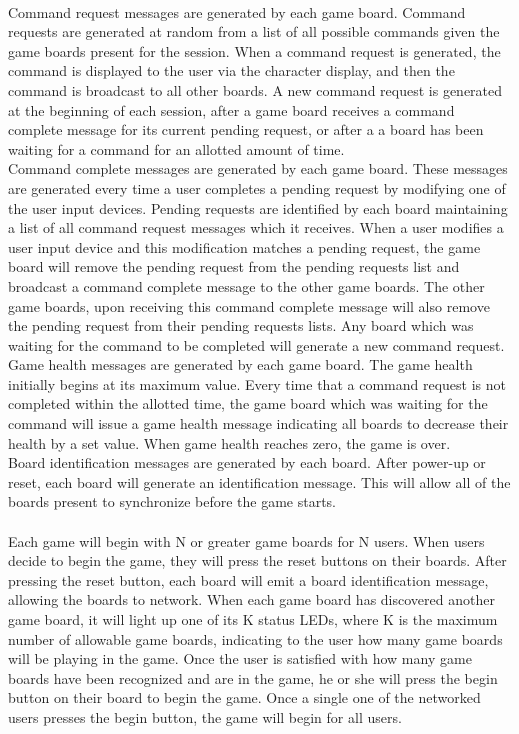 \documentclass[aps,letterpaper,10pt]{revtex4}
\begin{document}
\\

Command request messages are generated by each game board. Command requests are generated at random from a list of all possible commands given the game boards present for the session. When a command request is generated, the command is displayed to the user via the character display, and then the command is broadcast to all other boards. A new command request is generated at the beginning of each session, after a game board receives a command complete message for its current pending request, or after a a board has been waiting for a command for an allotted amount of time. \\

Command complete messages are generated by each game board. These messages are generated every time a user completes a pending request by modifying one of the user input devices. Pending requests are identified by each board maintaining a list of all command request messages which it receives. When a user modifies a user input device and this modification matches a pending request, the game board will remove the pending request from the pending requests list and broadcast a command complete message to the other game boards. The other game boards, upon receiving this command complete message will also remove the pending request from their pending requests lists. Any board which was waiting for the command to be completed will generate a new command request. \\

Game health messages are generated by each game board. The game health initially begins at its maximum value. Every time that a command request is not completed within the allotted time, the game board which was waiting for the command will issue a game health message indicating all boards to decrease their health by a set value. When game health reaches zero, the game is over. \\

Board identification messages are generated by each board. After power-up or reset, each board will generate an identification message. This will allow all of the boards present to synchronize before the game starts. \\

\\

Each game will begin with N or greater game boards for N users. When users decide to begin the game, they will press the reset buttons on their boards. After pressing the reset button, each board will emit a board identification message, allowing the boards to network. When each game board has discovered another game board, it will light up one of its K status LEDs, where K is the maximum number of allowable game boards, indicating to the user how many game boards will be playing in the game. Once the user is satisfied with how many game boards have been recognized and are in the game, he or she will press the begin button on their board to begin the game. Once a single one of the networked users presses the begin button, the game will begin for all users. \\
\end{document}
